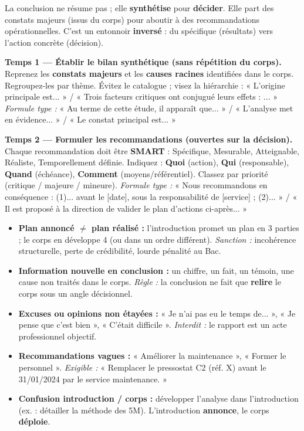 \documentclass[11pt]{article}
\begin{document}
La conclusion ne résume pas ; elle \textbf{synthétise} pour \textbf{décider}. Elle part des constats majeurs (issus du corps) pour aboutir à des recommandations opérationnelles. C'est un entonnoir \textbf{inversé} : du spécifique (résultats) vers l'action concrète (décision).

\begin{methode}
\textbf{Temps 1 — Établir le bilan synthétique (sans répétition du corps).}
Reprenez les \textbf{constats majeurs} et les \textbf{causes racines} identifiées dans le corps. Regroupez-les par thème. Évitez le catalogue ; visez la hiérarchie : « L'origine principale est... » / « Trois facteurs critiques ont conjugué leurs effets : ... »
\emph{Formule type :} « Au terme de cette étude, il apparaît que... » / « L'analyse met en évidence... » / « Le constat principal est... »

\textbf{Temps 2 — Formuler les recommandations (ouvertes sur la décision).}
Chaque recommandation doit être \textbf{SMART} : Spécifique, Mesurable, Atteignable, Réaliste, Temporellement définie. Indiquez : \textbf{Quoi} (action), \textbf{Qui} (responsable), \textbf{Quand} (échéance), \textbf{Comment} (moyens/référentiel). Classez par priorité (critique / majeure / mineure).
\emph{Formule type :} « Nous recommandons en conséquence : (1)... avant le [date], sous la responsabilité de [service] ; (2)... » / « Il est proposé à la direction de valider le plan d'actions ci-après... »
\end{methode}

\begin{attention}
\begin{itemize}
\item \textbf{Plan annoncé $\neq$ plan réalisé :} l'introduction promet un plan en 3 parties ; le corps en développe 4 (ou dans un ordre différent). \emph{Sanction :} incohérence structurelle, perte de crédibilité, lourde pénalité au Bac.
\item \textbf{Information nouvelle en conclusion :} un chiffre, un fait, un témoin, une cause non traités dans le corps. \emph{Règle :} la conclusion ne fait que \textbf{relire} le corps sous un angle décisionnel.
\item \textbf{Excuses ou opinions non étayées :} « Je n'ai pas eu le temps de... », « Je pense que c'est bien », « C'était difficile ». \emph{Interdit :} le rapport est un acte professionnel objectif.
\item \textbf{Recommandations vagues :} « Améliorer la maintenance », « Former le personnel ». \emph{Exigible :} « Remplacer le pressostat C2 (réf. X) avant le 31/01/2024 par le service maintenance. »
\item \textbf{Confusion introduction / corps :} développer l'analyse dans l'introduction (ex. : détailler la méthode des 5M). L'introduction \textbf{annonce}, le corps \textbf{déploie}.
\end{itemize}
\end{attention}
\end{document}
